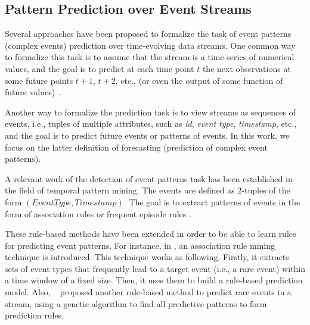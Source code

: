 

\subsection{Pattern Prediction over Event Streams}

\par Several approaches have been proposed to formalize the task of event patterns (complex events) prediction over time-evolving data streams.  One common way to formalize this task is to assume that the stream is a time-series of numerical values, and the goal is to predict at each time point $t$ the next observations at some future points $t+1$, $t+2$, etc., (or even the output of some function of future values)~\cite{montgomery_introduction_2015}. 



\par Another way to formalize the prediction task is to view streams as sequences of events,
i.e., tuples of multiple attributes, such as \textit{id}, \textit{event type}, \textit{timestamp}, etc., and the goal is to predict future events or patterns of events. In this work, we focus on the latter definition of forecasting (prediction of complex event patterns).  

\par A relevant work of the detection of event patterns task has been established in the field of temporal pattern mining. The events are defined as 2-tuples of the form \((\mathit{EventType}, \mathit{Timestamp})\). The goal is to extract patterns of events in the form of association rules \cite{agrawal_mining_1993} or frequent episode rules \cite{mannila_discovery_1997}. 

\par These rule-based methods have been extended in order to be able to learn rules for predicting event patterns. For instance, in \cite{vilalta_predicting_2002}, an association rule mining technique is introduced. This technique works as following. Firstly, it extracts sets of event types that frequently lead to a target event (i.e., a rare event) within a time window of a fixed size. Then, it uses them to build a rule-based prediction model. Also,  ~\citet{weiss1998learning} proposed another rule-based method to predict rare events in a stream, using a genetic algorithm to find all predictive patterns to form prediction rules.  


